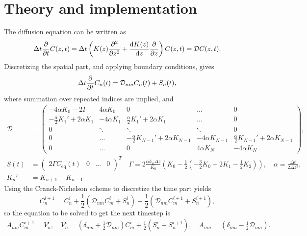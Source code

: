 \documentclass{article}
\begin{document}
    \section*{Theory and implementation}
    The diffusion equation can be written as
    \begin{equation*}
        \Delta t \pdv{t} C(z, t) = \Delta t \left(K(z) \pdv[2]{z} + \dv{K(z)}{z}\pdv{z}\right) C(z, t) = \mathcal{D} C(z, t).
    \end{equation*}
    Discretizing the spatial part, and applying boundary conditions, gives
    \begin{equation*}
        \Delta t \pdv{t} C_n(t) = \mathcal{D}_{nm} C_n(t) + S_n(t),
    \end{equation*}
    where summation over repeated indices are implied, and
    \begin{align*}
        \mathcal{D} &=
        \begin{pmatrix}
            -4\alpha K_0 - 2\Gamma & 4\alpha K_0 & 0 & \dots&0 \\
            -\frac{\alpha}{2} K_1' + 2\alpha K_1 & -4 \alpha K_1 & \frac{\alpha}{2}K_1' + 2\alpha K_1 &  \dots & 0 \\
            0 & \ddots & \ddots & \ddots & 0\\
            0 & \dots &-\frac{\alpha}{2} K_{N-1}' + 2\alpha K_{N-1} & -4 \alpha K_{N-1} & \frac{\alpha}{2}K_{N-1}' + 2\alpha K_{N-1} \\
             0 & \dots & 0 & 4\alpha K_N & -4\alpha K_N
        \end{pmatrix},\\
        S(t) & =  
        \begin{pmatrix}
            2\Gamma C_\mathrm{eq}(t) &0&\dots&0
        \end{pmatrix}^T \quad 
    \Gamma = 2 \frac{\alpha k_w \Delta z}{K_0} \left(K_0 - \frac{1}{2}(-\frac{3}{2} K_0 + 2K_1 - \frac{1}{2}K_2)\right), \quad
     \alpha = \frac{\Delta t}{2 \Delta z^2 },\\
      K_n' & = K_{n+1} - K_{n-1}
    \end{align*}
    Using the Cranck-Nichelson scheme to discretize the time part yields
    \begin{equation*}
        C_n^{i+1}  = C_n^i + \frac{1}{2} (\mathcal{D}_{nm} C_m^i + S_n^i) + \frac{1}{2} (\mathcal{D}_{nm} C_m^{i+1} + S_n^{i+1}),
    \end{equation*}
    so the equation to be solved to get the next timestep is
    \begin{align*}
        A_{nm} C_{m}^{i+1} = V_n^i, \quad V_n^i = \left(\delta_{nm} + \frac{1}{2} \mathcal{D}_{nm}\right) C_m^i + \frac{1}{2}(S_n^i + S_n^{i+1}), \quad 
        A_{mn} = \left(\delta_{nm} - \frac{1}{2} \mathcal{D}_{nm}\right).
    \end{align*}
    
\end{document}
